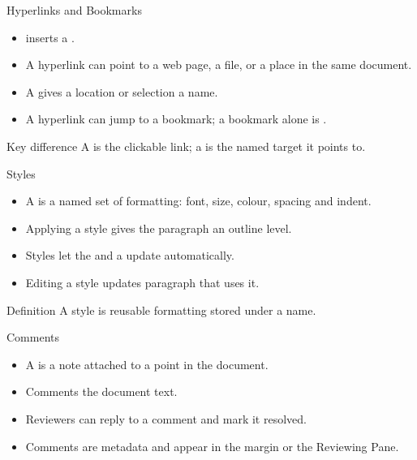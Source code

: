 \documentclass[aspectratio=169]{beamer}
\begin{document}
\begin{frame}{Hyperlinks and Bookmarks}
  \begin{itemize}
    \item {} inserts a .
    \item A hyperlink can point to a web page, a file, or a place in the same
      document.
    \item A  gives a location or selection a name.
    \item A hyperlink can jump to a bookmark; a bookmark alone is
      .
  \end{itemize}
  \begin{block}{Key difference}
    A  is the clickable link; a  is the named
    target it points to.
  \end{block}
\end{frame}

\begin{frame}{Styles}
  \begin{itemize}
    \item A  is a named set of formatting: font, size, colour,
      spacing and indent.
    \item Applying a  style gives the paragraph an outline level.
    \item Styles let the  and a 
      update automatically.
    \item Editing a style updates  paragraph that uses it.
  \end{itemize}
  \begin{block}{Definition}
    A style is reusable formatting stored under a name.
  \end{block}
\end{frame}

\begin{frame}{Comments}
  \begin{itemize}
    \item A  is a note attached to a point in the document.
    \item Comments  the document text.
    \item Reviewers can reply to a comment and mark it resolved.
    \item Comments are metadata and appear in the margin or the Reviewing
      Pane.
  \end{itemize}
\end{frame}
\end{document}
